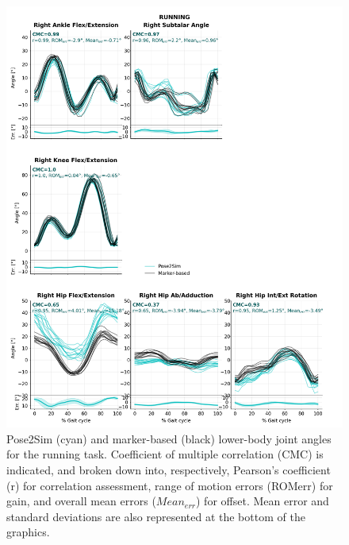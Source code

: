 \begin{figure}[!ht]
	\centering
	\def\svgwidth{1\columnwidth}
	\fontsize{10pt}{10pt}\selectfont
	\includegraphics[width=.94\linewidth]{"../Annexes/Figures/Fig_QTMRun.png"}
	\caption{Pose2Sim (cyan) and marker-based (black) lower-body joint angles for the running task. Coefficient of multiple correlation (CMC) is indicated, and broken down into, respectively, Pearson’s coefficient (r) for correlation assessment, range of motion errors (ROMerr) for gain, and overall mean errors (\(Mean_{err}\)) for offset. Mean error and standard deviations are also represented at the bottom of the graphics.}
	\label{fig_qtmrun}
\end{figure}

